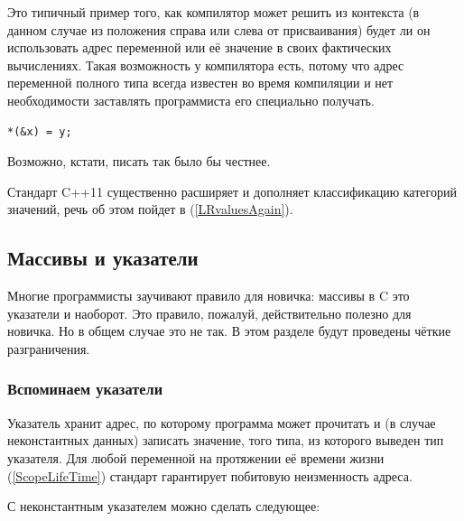\documentclass[a4paper,12pt,oneside]{article}
\begin{document}
Это типичный пример того, как компилятор может решить из контекста (в данном случае из положения справа или слева от присваивания) будет ли он использовать адрес переменной или её значение в своих фактических вычислениях. Такая возможность у компилятора есть, потому что адрес переменной полного типа всегда известен во время компиляции и нет необходимости заставлять программиста его специально получать.

\begin{lstlisting}
*(&x) = y;
\end{lstlisting}

Возможно, кстати, писать так было бы честнее.

Стандарт C++11 существенно расширяет и дополняет классификацию категорий значений, речь об этом пойдет в (\ref{LRvaluesAgain}).

\pagebreak
\subsection{Массивы и указатели}\label{ArrPointers}

Многие программисты заучивают правило для новичка: массивы в C это указатели и наоборот. Это правило, пожалуй, действительно полезно для новичка. Но в общем случае это не так. В этом разделе будут проведены чёткие разграничения. 

\subsubsection{Вспоминаем указатели}

Указатель хранит адрес, по которому программа может прочитать и (в случае неконстантных данных) записать значение, того типа, из которого выведен тип указателя. Для любой переменной на протяжении её времени жизни (\ref{ScopeLifeTime}) стандарт гарантирует побитовую неизменность адреса.

С неконстантным указателем можно сделать следующее:
\end{document}
